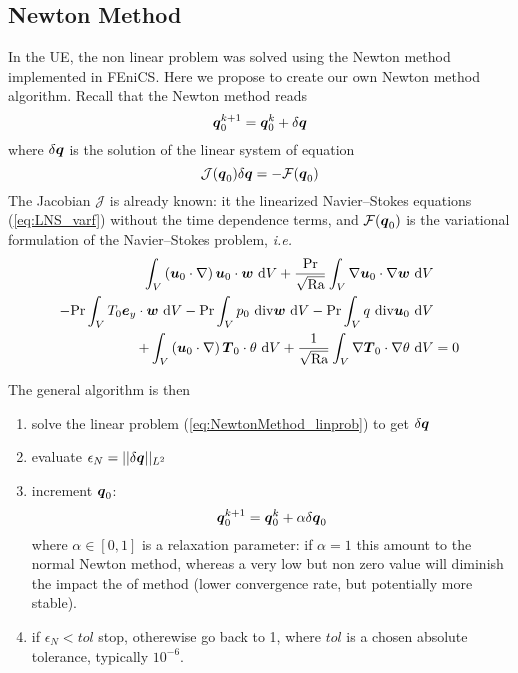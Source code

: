 \documentclass[12pt,a4paper]{scrartcl}
\renewcommand{\vec}[1]{{\mbox{\boldmath $ #1 $}}}
\newcommand{\dd}{\textrm{d}}
\def\Pran{\mbox{Pr}}  %
\def\Ra{\mbox{Ra}}    %
\begin{document}
\subsection{Newton Method}
In the UE, the non linear problem was solved using the Newton method implemented in FEniCS. Here we propose to create our own Newton method algorithm.
Recall that the Newton method reads
\begin{equation}
\vec q_0^{k+1} =  \vec q_0^{k} + \delta \vec q 
\end{equation}
where $\delta\vec q$ is the solution of the linear system of equation
\begin{equation} \label{eq:NewtonMethod_linprob}
\mathcal J(\vec q_0) \delta \vec q = -\mathcal F(\vec q_0)
\end{equation}
The Jacobian $\mathcal J$ is already known: it the linearized Navier--Stokes equations (\ref{eq:LNS_varf}) without the time dependence terms, and $\mathcal F(\vec q_0)$ is the variational formulation of the Navier--Stokes problem, \textit{i.e.} 
\begin{align}\label{eq:NS_varf}
\int_V    \left(\vec u_0 \cdot \nabla  \right)\vec u_0  \cdot \vec w   \ \dd V      + \frac{\Pran}{\sqrt{\Ra}}\int_V \nabla \vec u_0 \cdot \nabla \vec w \ \dd V & \\
- \Pran\int_V T_0 \vec e_y \cdot \vec w \ \dd V  - \Pran\int_V  p_0 \ \mathrm{div} \vec w \ \dd V   - \Pran\int_V  q \ \mathrm{div} \vec u_0 \ \dd V & \nonumber \\
+ \int_V \left(\vec u_0 \cdot \nabla  \right)\vec T_0  \cdot \theta   \ \dd V  + \frac{1}{\sqrt{\Ra}}\int_V \nabla \vec T_0 \cdot \nabla \theta \ \dd V & = 0 \nonumber
\end{align}


The general algorithm is then
\begin{enumerate}
\item solve the linear problem (\ref{eq:NewtonMethod_linprob}) to get $\delta \vec q$
\item evaluate $\epsilon_N = \vert\vert\delta \vec q \vert\vert_{L^2}$
\item increment $\vec q_0$:
\begin{equation}
  \vec q_0^{k+1} =    \vec q_0^{k} + \alpha \delta \vec q_0
\end{equation}
where $\alpha \in [0,1]$ is a relaxation parameter: if $\alpha=1$ this amount to the normal Newton method, whereas a very low but non zero value will diminish the impact the of method (lower convergence rate, but potentially more stable).
\item if $\epsilon_N< tol$ stop, otherewise go back to 1, where $tol$ is a chosen absolute tolerance, typically $10^{-6}$.
\end{enumerate}
\end{document}
